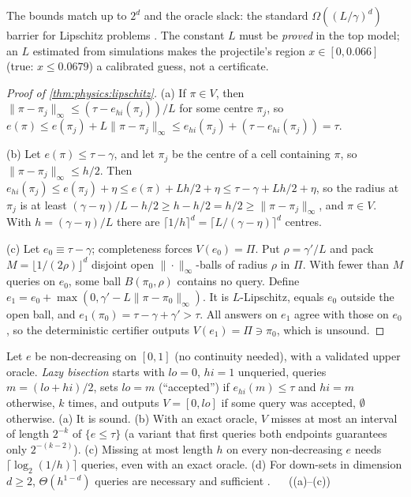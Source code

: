 The bounds match up to $2^d$ and the oracle slack: the standard $\Omega((L/\gamma)^d)$
barrier for Lipschitz problems \citep{nemirovsky1983problem}. The constant $L$ must be
\emph{proved} in the top model; an $L$ estimated from simulations makes the projectile's
region $x\in[0,0.066]$ (true: $x\le0.0679$) a calibrated guess, not a certificate.

\begin{proof}[Proof of \cref{thm:physics:lipschitz}]
(a) If $\pi\in V$, then $\|\pi-\pi_j\|_\infty\le(\tau-e_{hi}(\pi_j))/L$ for some centre
$\pi_j$, so $e(\pi)\le e(\pi_j)+L\|\pi-\pi_j\|_\infty\le e_{hi}(\pi_j)+(\tau-e_{hi}(\pi_j))=\tau$.

(b) Let $e(\pi)\le\tau-\gamma$, and let $\pi_j$ be the centre of a cell containing $\pi$, so
$\|\pi-\pi_j\|_\infty\le h/2$. Then $e_{hi}(\pi_j)\le e(\pi_j)+\eta\le e(\pi)+Lh/2+\eta\le
\tau-\gamma+Lh/2+\eta$, so the radius at $\pi_j$ is at least
$(\gamma-\eta)/L-h/2\ge h-h/2=h/2\ge\|\pi-\pi_j\|_\infty$, and $\pi\in V$. With
$h=(\gamma-\eta)/L$ there are $\lceil1/h\rceil^d=\lceil L/(\gamma-\eta)\rceil^d$ centres.

(c) Let $e_0\equiv\tau-\gamma$; completeness forces $V(e_0)=\Pi$. Put $\rho=\gamma'/L$ and pack
$M=\lfloor1/(2\rho)\rfloor^d$ disjoint open $\|\cdot\|_\infty$-balls of radius $\rho$ in $\Pi$.
With fewer than $M$ queries on $e_0$, some ball $B(\pi_0,\rho)$ contains no query. Define
$e_1=e_0+\max(0,\gamma'-L\|\pi-\pi_0\|_\infty)$. It is $L$-Lipschitz, equals $e_0$ outside the
open ball, and $e_1(\pi_0)=\tau-\gamma+\gamma'>\tau$. All answers on $e_1$ agree with those
on $e_0$, so the deterministic certifier outputs $V(e_1)=\Pi\ni\pi_0$, which is unsound.
\end{proof}

\begin{theorem}\label{thm:physics:monotone}
Let $e$ be non-decreasing on $[0,1]$ (no continuity needed), with a validated upper oracle.
\emph{Lazy bisection} starts with $lo=0$, $hi=1$ unqueried, queries $m=(lo+hi)/2$, sets
$lo=m$ (``accepted'') if $e_{hi}(m)\le\tau$ and $hi=m$ otherwise, $k$ times, and outputs
$V=[0,lo]$ if some query was accepted, $\emptyset$ otherwise. (a) It is sound. (b) With an
exact oracle, $V$ misses at most an interval of length $2^{-k}$ of $\{e\le\tau\}$ (a variant
that first queries both endpoints guarantees only $2^{-(k-2)}$). (c) Missing at most length
$h$ on every non-decreasing $e$ needs $\lceil\log_2(1/h)\rceil$ queries, even with an exact
oracle. (d) For down-sets in dimension $d\ge2$, $\Theta(h^{1-d})$ queries are necessary and
sufficient .
\hfill{}\ \  ((a)--(c))
\end{theorem}

